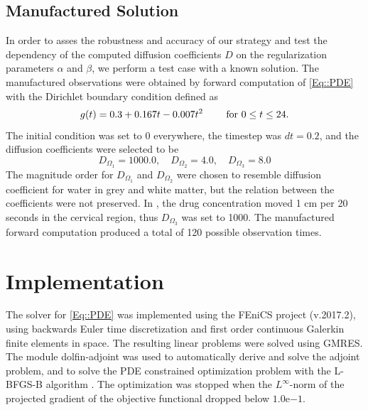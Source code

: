 \documentclass[11pt,a4paper]{article}
\newcommand{\fixme}[1]{\textcolor{orange}{#1}}
\newcommand{\lars}[1]{\textcolor{magenta}{#1}}
\begin{document}
\subsection{Manufactured Solution}
In order to asses the robustness and accuracy of our strategy and test the dependency of the computed diffusion coefficients $D$ on the
regularization parameters $\alpha$ and $\beta$, we perform a test case with a
known solution.  
The manufactured observations were obtained by forward computation of \eqref{Eq::PDE} with the Dirichlet boundary condition defined as
\begin{equation}
g(t) = 0.3 +0.167t - 0.007t\sp{2} \qquad \text{ for } 0 \leq t \leq 24.
\label{EQ::DIRI}
\end{equation}
The initial condition was set to 0 everywhere, the timestep was $dt = 0.2$, and the diffusion coefficients were selected to be 
\begin{equation}
D_{\Omega_1} = 1000.0, \quad D_{\Omega_2} = 4.0, \quad D_{\Omega_3} = 8.0 
\end{equation}  
The magnitude order for $D_{\Omega_1} $ and $D_{\Omega_2}$ were chosen to resemble diffusion coefficient for water in grey and white matter, but the relation between the coefficients were not preserved. In \citet{Haga}, the drug concentration moved 1 cm per 20 seconds in the cervical region, thus $D_{\Omega_3}$  was set to 1000. The manufactured forward computation produced a total of 120 possible observation times.


\section{Implementation}

The solver for \eqref{Eq::PDE} was implemented using the FEniCS project (v.2017.2), using backwards Euler time discretization and first order continuous Galerkin finite elements in space. The resulting linear problems were solved using GMRES.
The module dolfin-adjoint \cite{farrell2013automated, funke2013framework} was used to automatically derive and solve the adjoint problem, and to solve the PDE constrained optimization problem with the L-BFGS-B algorithm \cite{LBFGSB1, LBFGSB2}. The optimization was stopped when the $L^\infty$-norm of the projected gradient of the objective functional dropped below $1.0\mathrm{e}{-1}$.
\end{document}
